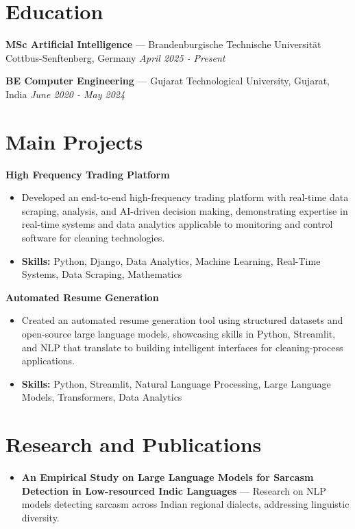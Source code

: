 \documentclass[a4paper,10pt]{article}
\begin{document}
\section*{Education}
\textbf{MSc Artificial Intelligence} — Brandenburgische Technische Universität Cottbus-Senftenberg, Germany \hfill \textit{April 2025 - Present}\par
\vspace{1.5pt}
\textbf{BE Computer Engineering} — Gujarat Technological University, Gujarat, India \hfill \textit{June 2020 - May 2024}\par

\section*{Main Projects}
\textbf{High Frequency Trading Platform}\par
\vspace{1pt}
\begin{itemize}
  \item Developed an end-to-end high-frequency trading platform with real-time data scraping, analysis, and AI-driven decision making, demonstrating expertise in real-time systems and data analytics applicable to monitoring and control software for cleaning technologies.
  \item \textbf{Skills:} Python, Django, Data Analytics, Machine Learning, Real-Time Systems, Data Scraping, Mathematics
\end{itemize}
\vspace{3pt}
\textbf{Automated Resume Generation}\par
\vspace{1pt}
\begin{itemize}
  \item Created an automated resume generation tool using structured datasets and open-source large language models, showcasing skills in Python, Streamlit, and NLP that translate to building intelligent interfaces for cleaning-process applications.
  \item \textbf{Skills:} Python, Streamlit, Natural Language Processing, Large Language Models, Transformers, Data Analytics
\end{itemize}

\section*{Research and Publications}
\begin{itemize}
\item \textbf{An Empirical Study on Large Language Models for Sarcasm Detection in Low-resourced Indic Languages} — Research on NLP models detecting sarcasm across Indian regional dialects, addressing linguistic diversity.
\end{itemize}
\end{document}
